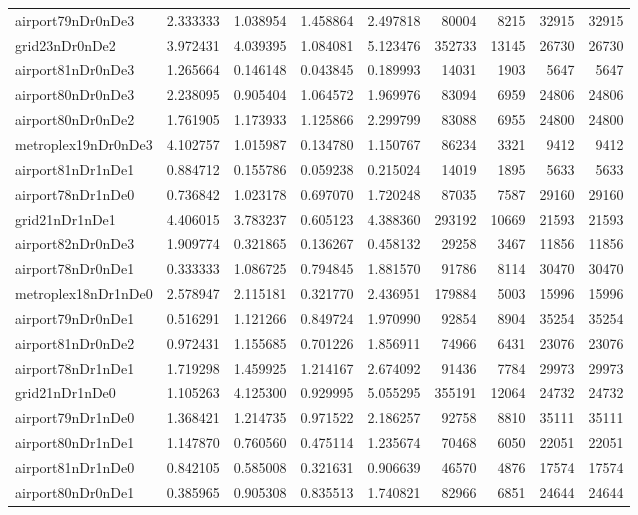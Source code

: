 \begin{longtable}{|l|r|r|r|r|r|r|r|r|}
airport79nDr0nDe3 & 2.333333 & 1.038954 & 1.458864 & 2.497818 & 80004 & 8215 & 32915 & 32915 \\
grid23nDr0nDe2 & 3.972431 & 4.039395 & 1.084081 & 5.123476 & 352733 & 13145 & 26730 & 26730 \\
airport81nDr0nDe3 & 1.265664 & 0.146148 & 0.043845 & 0.189993 & 14031 & 1903 & 5647 & 5647 \\
airport80nDr0nDe3 & 2.238095 & 0.905404 & 1.064572 & 1.969976 & 83094 & 6959 & 24806 & 24806 \\
airport80nDr0nDe2 & 1.761905 & 1.173933 & 1.125866 & 2.299799 & 83088 & 6955 & 24800 & 24800 \\
metroplex19nDr0nDe3 & 4.102757 & 1.015987 & 0.134780 & 1.150767 & 86234 & 3321 & 9412 & 9412 \\
airport81nDr1nDe1 & 0.884712 & 0.155786 & 0.059238 & 0.215024 & 14019 & 1895 & 5633 & 5633 \\
airport78nDr1nDe0 & 0.736842 & 1.023178 & 0.697070 & 1.720248 & 87035 & 7587 & 29160 & 29160 \\
grid21nDr1nDe1 & 4.406015 & 3.783237 & 0.605123 & 4.388360 & 293192 & 10669 & 21593 & 21593 \\
airport82nDr0nDe3 & 1.909774 & 0.321865 & 0.136267 & 0.458132 & 29258 & 3467 & 11856 & 11856 \\
airport78nDr0nDe1 & 0.333333 & 1.086725 & 0.794845 & 1.881570 & 91786 & 8114 & 30470 & 30470 \\
metroplex18nDr1nDe0 & 2.578947 & 2.115181 & 0.321770 & 2.436951 & 179884 & 5003 & 15996 & 15996 \\
airport79nDr0nDe1 & 0.516291 & 1.121266 & 0.849724 & 1.970990 & 92854 & 8904 & 35254 & 35254 \\
airport81nDr0nDe2 & 0.972431 & 1.155685 & 0.701226 & 1.856911 & 74966 & 6431 & 23076 & 23076 \\
airport78nDr1nDe1 & 1.719298 & 1.459925 & 1.214167 & 2.674092 & 91436 & 7784 & 29973 & 29973 \\
grid21nDr1nDe0 & 1.105263 & 4.125300 & 0.929995 & 5.055295 & 355191 & 12064 & 24732 & 24732 \\
airport79nDr1nDe0 & 1.368421 & 1.214735 & 0.971522 & 2.186257 & 92758 & 8810 & 35111 & 35111 \\
airport80nDr1nDe1 & 1.147870 & 0.760560 & 0.475114 & 1.235674 & 70468 & 6050 & 22051 & 22051 \\
airport81nDr1nDe0 & 0.842105 & 0.585008 & 0.321631 & 0.906639 & 46570 & 4876 & 17574 & 17574 \\
airport80nDr0nDe1 & 0.385965 & 0.905308 & 0.835513 & 1.740821 & 82966 & 6851 & 24644 & 24644 \\

\end{longtable}
